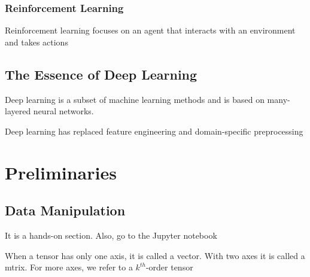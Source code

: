 \documentclass[]{article}
\begin{document}
\subsubsection{Reinforcement Learning}
Reinforcement learning focuses on an agent that interacts with an environment and
takes actions

\setcounter{subsection}{6}
\subsection{The Essence of Deep Learning}
Deep learning is a subset of machine learning methods and is based on many-layered
neural networks.

Deep learning has replaced feature engineering and domain-specific preprocessing

\section{Preliminaries}
\subsection{Data Manipulation}
It is a hands-on section. Also, go to the Jupyter notebook

When a tensor has only one axis, it is called a vector. With two axes it is called
a mtrix. For more axes, we refer to a $k^{th}$-order tensor
\end{document}
